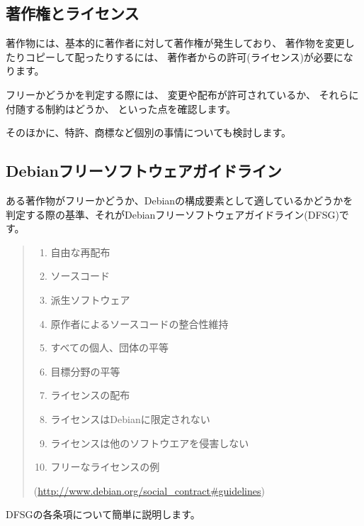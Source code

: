 \documentclass[mingoth,a4paper]{jsarticle}
\begin{document}
\subsection{著作権とライセンス}

著作物には、基本的に著作者に対して著作権が発生しており、
著作物を変更したりコピーして配ったりするには、
著作者からの許可(ライセンス)が必要になります。

フリーかどうかを判定する際には、
変更や配布が許可されているか、
それらに付随する制約はどうか、
といった点を確認します。

そのほかに、特許、商標など個別の事情についても検討します。

\subsection{Debianフリーソフトウェアガイドライン}

ある著作物がフリーかどうか、Debianの構成要素として適しているかどうかを
判定する際の基準、それがDebianフリーソフトウェアガイドライン(DFSG)です。

\begin{quote}
\begin{enumerate}
 \item 自由な再配布

 \item ソースコード

 \item 派生ソフトウェア

 \item 原作者によるソースコードの整合性維持

 \item すべての個人、団体の平等

 \item 目標分野の平等

 \item ライセンスの配布

 \item ライセンスはDebianに限定されない

 \item ライセンスは他のソフトウエアを侵害しない

 \item フリーなライセンスの例

\end{enumerate}

(\url{http://www.debian.org/social_contract#guidelines})
\end{quote}

DFSGの各条項について簡単に説明します。
\end{document}
